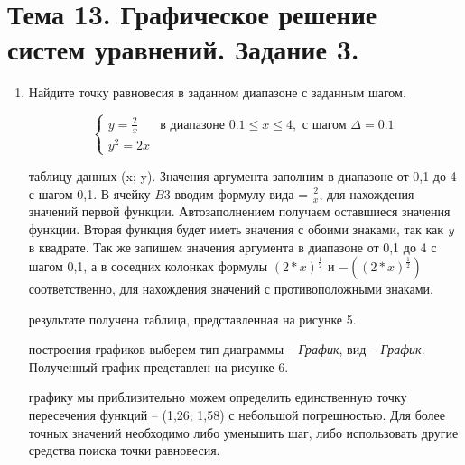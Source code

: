 \section{Тема 13. Графическое решение систем уравнений. Задание 3.}
\label{sec:task13}

\begin{enumerate}
	\item\large
	Найдите точку равновесия в заданном диапазоне с заданным шагом.

		\[
			\begin{cases}
			    y = \frac{2}{x} & \text{в диапазоне } 0.1 \leq x \leq 4, \text{ с шагом } \Delta = 0.1 \\
			    y^2 = 2x
			\end{cases}
		\]
	\begin{item}
		 таблицу данных (x; y). Значения аргумента заполним в диапазоне от 0,1 до 4 с шагом 0,1. В ячейку $B3$ вводим формулу вида = $\frac{2}{x}$, для нахождения значений первой функции. Автозаполнением получаем оставшиеся значения функции. Вторая функция будет иметь значения с обоими знаками, так как \textit{y} в квадрате. Так же запишем значения аргумента в диапазоне от 0,1 до 4 с шагом 0,1, а в соседних колонках формулы $(2 * x) ^ \frac{1}{2}$ и $-((2 * x) ^ \frac{1}{2})$ соответственно, для нахождения значений с противоположными знаками.

		 результате получена таблица, представленная на рисунке 5.

        \newpage

		 построения графиков выберем тип диаграммы -- \textit{График}, вид -- \textit{График}. Полученный график представлен на рисунке 6.


		 графику мы приблизительно можем определить единственную точку пересечения функций -- (1,26; 1,58) с небольшой погрешностью. Для более точных значений необходимо либо уменьшить шаг, либо использовать другие средства поиска точки равновесия.
	\end{item}
\end{enumerate}